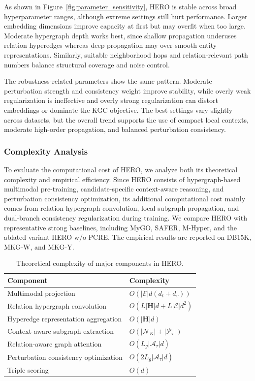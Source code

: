 \documentclass[pdflatex,sn-mathphys-num]{sn-jnl}
\begin{document}
As shown in Figure~\ref{fig:parameter_sensitivity}, HERO is stable across broad hyperparameter ranges, although extreme settings still hurt performance. Larger embedding dimensions improve capacity at first but may overfit when too large. Moderate hypergraph depth works best, since shallow propagation underuses relation hyperedges whereas deep propagation may over-smooth entity representations. Similarly, suitable neighborhood hops and relation-relevant path numbers balance structural coverage and noise control.

The robustness-related parameters show the same pattern. Moderate perturbation strength and consistency weight improve stability, while overly weak regularization is ineffective and overly strong regularization can distort embeddings or dominate the KGC objective. The best settings vary slightly across datasets, but the overall trend supports the use of compact local contexts, moderate high-order propagation, and balanced perturbation consistency.


\subsubsection{Complexity Analysis}

To evaluate the computational cost of HERO, we analyze both its theoretical complexity and empirical efficiency. Since HERO consists of hypergraph-based multimodal pre-training, candidate-specific context-aware reasoning, and perturbation consistency optimization, its additional computational cost mainly comes from relation hypergraph convolution, local subgraph propagation, and dual-branch consistency regularization during training. We compare HERO with representative strong baselines, including MyGO, SAFER, M-Hyper, and the ablated variant HERO w/o PCRE. The empirical results are reported on DB15K, MKG-W, and MKG-Y.

\begin{table}[t]
\centering
\caption{Theoretical complexity of major components in HERO.}
\label{tab:theoretical_complexity}
\begin{tabular}{ll}
\toprule
\textbf{Component} & \textbf{Complexity} \\
\midrule
Multimodal projection & $O(|\mathcal{E}|d(d_t+d_v))$ \\
Relation hypergraph convolution & $O(L|\mathbf{H}|d + L|\mathcal{E}|d^2)$ \\
Hyperedge representation aggregation & $O(|\mathbf{H}|d)$ \\
Context-aware subgraph extraction & $O(|\mathcal{N}_{K}| + |\mathcal{P}_{\tau}|)$ \\
Relation-aware graph attention & $O(L_g|\mathcal{A}_{\tau}|d)$ \\
Perturbation consistency optimization & $O(2L_g|\mathcal{A}_{\tau}|d)$ \\
Triple scoring & $O(d)$ \\
\bottomrule
\end{tabular}
\end{table}
\end{document}
